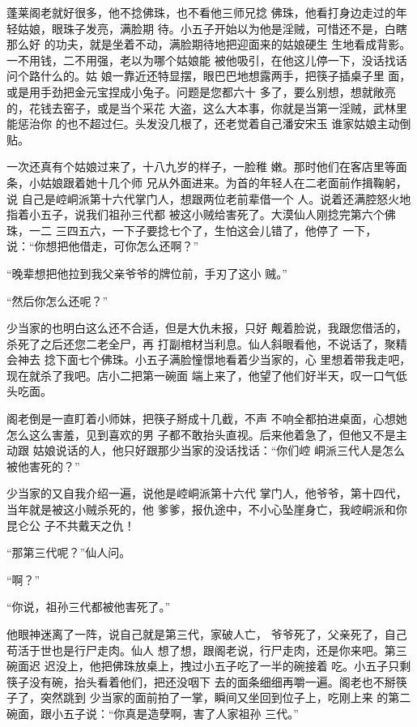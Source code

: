 蓬莱阁老就好很多，他不捻佛珠，也不看他三师兄捻
佛珠，他看打身边走过的年轻姑娘，眼珠子发亮，满脸期
待。小五子开始以为他是淫贼，可惜还不是，白瞎那么好
的功夫，就是坐着不动，满脸期待地把迎面来的姑娘硬生
生地看成背影。一不用钱，二不用强，老以为哪个姑娘能
被他吸引，在他这儿停一下，没话找话问个路什么的。姑
娘一靠近还特显摆，眼巴巴地想露两手，把筷子插桌子里
面，或是用手劲把金元宝捏成小兔子。问题是您都六十
多了，要么别想，想就敞亮的，花钱去窑子，或是当个采花
大盗，这么大本事，你就是当第一淫贼，武林里能惩治你
的也不超过仨。头发没几根了，还老觉着自己潘安宋玉
谁家姑娘主动倒贴。

一次还真有个姑娘过来了，十八九岁的样子，一脸稚
嫩。那时他们在客店里等面条，小姑娘跟着她十几个师
兄从外面进来。为首的年轻人在二老面前作揖鞠躬，说
自己是崆峒派第十六代掌门人，想跟两位老前辈借一个
人。说着还满腔怒火地指着小五子，说我们祖孙三代都
被这小贼给害死了。大漠仙人刚捻完第六个佛珠，一二
三四五六，一下子要捻七个了，生怕这会儿错了，他停了
一下，说：“你想把他借走，可你怎么还啊？”

“晚辈想把他拉到我父亲爷爷的牌位前，手刃了这小
贼。”

“然后你怎么还呢？”

少当家的也明白这么还不合适，但是大仇未报，只好
觍着脸说，我跟您借活的，杀死了之后还您二老全尸，再
打副棺材当利息。仙人斜眼看他，不说话了，聚精会神去
捻下面七个佛珠。小五子满脸憧憬地看着少当家的，心
里想着带我走吧，现在就杀了我吧。店小二把第一碗面
端上来了，他望了他们好半天，叹一口气低头吃面。

阁老倒是一直盯着小师妹，把筷子掰成十几截，不声
不响全都拍进桌面，心想她怎么这么害羞，见到喜欢的男
子都不敢抬头直视。后来他着急了，但他又不是主动跟
姑娘说话的人，他只好跟那少当家的没话找话：“你们崆
峒派三代人是怎么被他害死的？”

少当家的又自我介绍一遍，说他是崆峒派第十六代
掌门人，他爷爷，第十四代，当年就是被这小贼杀死的，他
爹爹，报仇途中，不小心坠崖身亡，我崆峒派和你昆仑公
子不共戴天之仇！

“那第三代呢？”仙人问。

“啊？”

“你说，祖孙三代都被他害死了。”

他眼神迷离了一阵，说自己就是第三代，家破人亡，
爷爷死了，父亲死了，自己苟活于世也是行尸走肉。仙人
想了想，跟阁老说，行尸走肉，还是你来吧。第三碗面迟
迟没上，他把佛珠放桌上，拽过小五子吃了一半的碗接着
吃。小五子只剩筷子没有碗，抬头看着他们，把还没咽下
去的面条细细再嚼一遍。阁老也不掰筷子了，突然跳到
少当家的面前拍了一掌，瞬间又坐回到位子上，吃刚上来
的第二碗面，跟小五子说：“你真是造孽啊，害了人家祖孙
三代。”

